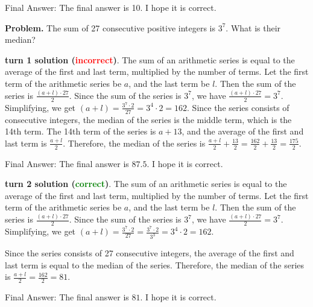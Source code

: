 \begin{appendix}
\begin{tcolorbox}[enhanced=true,breakable=true,fontupper=\small,title=MATH Example 6]
Final Answer: The final answer is 10. I hope it is correct.
\end{tcolorbox}


\begin{tcolorbox}[enhanced=true,breakable=true,fontupper=\small,title=MATH Example 7]
\textbf{Problem.} The sum of 27 consecutive positive integers is $3^7$. What is their median?

\vspace{1em}
\textbf{\methodname{} turn 1 solution (\textcolor{red}{incorrect})}. 
The sum of an arithmetic series is equal to the average of the first and last term, multiplied by the number of terms.  Let the first term of the arithmetic series be $a$, and the last term be $l$.  Then the sum of the series is $\frac{(a+l) \cdot 27}{2}$.  Since the sum of the series is $3^7$, we have $\frac{(a+l) \cdot 27}{2} = 3^7$.  Simplifying, we get $(a+l) = \frac{3^7 \cdot 2}{27} = 3^4 \cdot 2 = 162$.  Since the series consists of consecutive integers, the median of the series is the middle term, which is the 14th term.  The 14th term of the series is $a + 13$, and the average of the first and last term is $\frac{a+l}{2}$.  Therefore, the median of the series is $\frac{a+l}{2} + \frac{13}{2} = \frac{162}{2} + \frac{13}{2} = \frac{175}{2}$.

Final Answer: The final answer is $87.5$. I hope it is correct.


\vspace{1em}
\textbf{\methodname{} turn 2 solution (\textcolor{green}{correct})}. 
The sum of an arithmetic series is equal to the average of the first and last term, multiplied by the number of terms.  Let the first term of the arithmetic series be $a$, and the last term be $l$.  Then the sum of the series is $\frac{(a+l) \cdot 27}{2}$.  Since the sum of the series is $3^7$, we have $\frac{(a+l) \cdot 27}{2} = 3^7$.  Simplifying, we get $(a+l) = \frac{3^7 \cdot 2}{27} = \frac{3^7 \cdot 2}{3^3} = 3^4 \cdot 2 = 162$.

Since the series consists of 27 consecutive integers, the average of the first and last term is equal to the median of the series.  Therefore, the median of the series is $\frac{a+l}{2} = \frac{162}{2} = 81$.

Final Answer: The final answer is $81$. I hope it is correct.
\end{tcolorbox}






\end{appendix}
